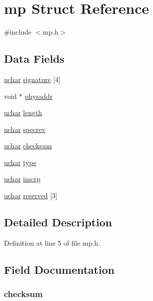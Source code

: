 \hypertarget{structmp}{\section{mp Struct Reference}
\label{structmp}
}


{\ttfamily \#include $<$mp.\-h$>$}

\subsection*{Data Fields}
\begin{DoxyCompactItemize}
\item 
\hyperlink{types_8h_a65f85814a8290f9797005d3b28e7e5fc}{uchar} \hyperlink{structmp_a086ff3269e8b74e0f05b9120d4cac23b}{signature} \mbox{[}4\mbox{]}
\item 
void $\ast$ \hyperlink{structmp_a296f4b12bd3434a24b7f500e03c349e6}{physaddr}
\item 
\hyperlink{types_8h_a65f85814a8290f9797005d3b28e7e5fc}{uchar} \hyperlink{structmp_a180b846dc61a2dd05de3a1d6da4f3c44}{length}
\item 
\hyperlink{types_8h_a65f85814a8290f9797005d3b28e7e5fc}{uchar} \hyperlink{structmp_a3241a69299a13c78c22ccfe7ec22e90d}{specrev}
\item 
\hyperlink{types_8h_a65f85814a8290f9797005d3b28e7e5fc}{uchar} \hyperlink{structmp_a282c64bb49f098de8b45dfc535c91ac5}{checksum}
\item 
\hyperlink{types_8h_a65f85814a8290f9797005d3b28e7e5fc}{uchar} \hyperlink{structmp_a7720cfa5e476235d84bbe5bb8ad56959}{type}
\item 
\hyperlink{types_8h_a65f85814a8290f9797005d3b28e7e5fc}{uchar} \hyperlink{structmp_aaf1948d64f988c62ec336c0f5671f7ee}{imcrp}
\item 
\hyperlink{types_8h_a65f85814a8290f9797005d3b28e7e5fc}{uchar} \hyperlink{structmp_a53d99441ce014bd1cb1903e40a497d90}{reserved} \mbox{[}3\mbox{]}
\end{DoxyCompactItemize}


\subsection{Detailed Description}


Definition at line 5 of file mp.\-h.



\subsection{Field Documentation}
\hypertarget{structmp_a282c64bb49f098de8b45dfc535c91ac5}{
\subsubsection[{checksum}]{ checksum}}\label{structmp_a282c64bb49f098de8b45dfc535c91ac5}


